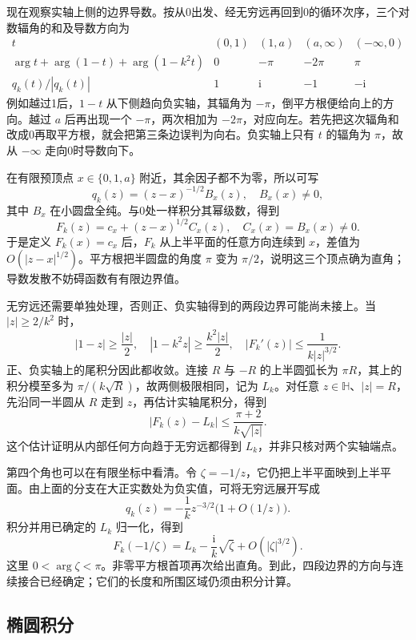 \ProseParagraphBreak

现在观察实轴上侧的边界导数。按从0出发、经无穷远再回到0的循环次序，三个对数辐角的和及导数方向为
\[
\begin{array}{c|cccc}
 t&(0,1)&(1,a)&(a,\infty)&(-\infty,0)\\ \hline
 \arg t+\arg(1-t)+\arg(1-k^2t)
   &0&-\pi&-2\pi&\pi\\
 q_k(t)/|q_k(t)|&1&\mathrm{i}&-1&-\mathrm{i}
\end{array}
\]
例如越过1后，\(1-t\) 从下侧趋向负实轴，其辐角为 \(-\pi\)，倒平方根便给向上的方向。越过 \(a\) 后再出现一个 \(-\pi\)，两次相加为 \(-2\pi\)，对应向左。若先把这次辐角和改成0再取平方根，就会把第三条边误判为向右。负实轴上只有 \(t\) 的辐角为 \(\pi\)，故从 \(-\infty\) 走向0时导数向下。

\ProseParagraphBreak

在有限预顶点 \(x\in\{0,1,a\}\) 附近，其余因子都不为零，所以可写
\[
 q_k(z)=(z-x)^{-1/2}B_x(z),\quad B_x(x)\ne0,
\]
其中 \(B_x\) 在小圆盘全纯。与0处一样积分其幂级数，得到
\[
 F_k(z)=c_x+(z-x)^{1/2}C_x(z),\quad C_x(x)=B_x(x)\ne0.
\]
于是定义 \(F_k(x)=c_x\) 后，\(F_k\) 从上半平面的任意方向连续到 \(x\)，差值为 \(O(|z-x|^{1/2})\)。平方根把半圆盘的角度 \(\pi\) 变为 \(\pi/2\)，说明这三个顶点确为直角；导数发散不妨碍函数有有限边界值。

\ProseParagraphBreak

无穷远还需要单独处理，否则正、负实轴得到的两段边界可能尚未接上。当 \(|z|\ge2/k^2\) 时，
\[
 |1-z|\ge\frac{|z|}{2},\quad
 |1-k^2z|\ge\frac{k^2|z|}{2},\quad
 |F_k'(z)|\le\frac1{k|z|^{3/2}}.
\]
正、负实轴上的尾积分因此都收敛。连接 \(R\) 与 \(-R\) 的上半圆弧长为 \(\pi R\)，其上的积分模至多为 \(\pi/(k\sqrt R)\)，故两侧极限相同，记为 \(L_k\)。对任意 \(z\in\mathbb H\)、\(|z|=R\)，先沿同一半圆从 \(R\) 走到 \(z\)，再估计实轴尾积分，得到
\[
 |F_k(z)-L_k|\le\frac{\pi+2}{k\sqrt{|z|}}.
\]
这个估计证明从内部任何方向趋于无穷远都得到 \(L_k\)，并非只核对两个实轴端点。

\ProseParagraphBreak

第四个角也可以在有限坐标中看清。令 \(\zeta=-1/z\)，它仍把上半平面映到上半平面。由上面的分支在大正实数处为负实值，可将无穷远展开写成
\[
 q_k(z)=-\frac1kz^{-3/2}\bigl(1+O(1/z)\bigr).
\]
积分并用已确定的 \(L_k\) 归一化，得到
\[
 F_k(-1/\zeta)
 =L_k-\frac{\mathrm{i}}k\sqrt\zeta+O(|\zeta|^{3/2}).
\]
这里 \(0<\arg\zeta<\pi\)。非零平方根首项再次给出直角。到此，四段边界的方向与连续接合已经确定；它们的长度和所围区域仍须由积分计算。

\subsection{椭圆积分}
\label{b3:subsec:070402}

